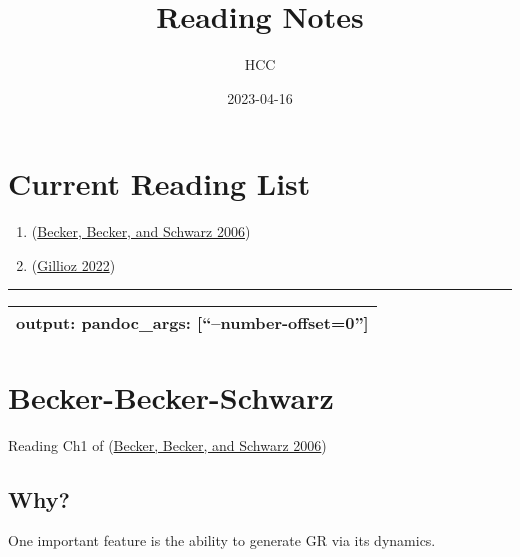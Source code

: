 \documentclass[
]{book}
\title{Reading Notes}
\author{HCC}
\date{2023-04-16}
\providecommand{\tightlist}{%
  \setlength{\itemsep}{0pt}\setlength{\parskip}{0pt}}
\begin{document}
\maketitle

{
\setcounter{tocdepth}{1}
\tableofcontents
}
\hypertarget{current-reading-list}{%
\chapter*{Current Reading List}\label{current-reading-list}}

\begin{enumerate}
\def\labelenumi{\arabic{enumi}.}
\tightlist
\item
  (\protect\hyperlink{ref-becker2006string}{Becker, Becker, and Schwarz 2006})
\item
  (\protect\hyperlink{ref-gillioz2022conformal}{Gillioz 2022})
\end{enumerate}

\begin{center}\rule{0.5\linewidth}{0.5pt}\end{center}

\begin{longtable}[]{@{}l@{}}
\toprule
\endhead
output: pandoc\_args: {[}``--number-offset=0''{]} \\
\bottomrule
\end{longtable}

\hypertarget{becker-becker-schwarz}{%
\chapter*{Becker-Becker-Schwarz}\label{becker-becker-schwarz}}

Reading Ch1 of (\protect\hyperlink{ref-becker2006string}{Becker, Becker, and Schwarz 2006})

\hypertarget{why}{%
\section{Why?}\label{why}}

One important feature is the ability to generate GR via its dynamics.
\end{document}
